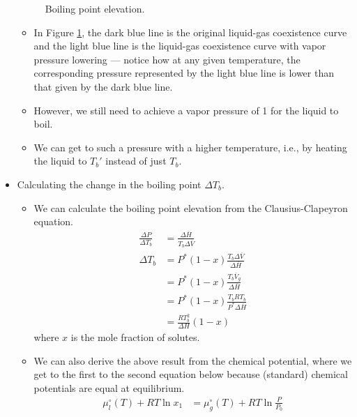 \documentclass[../notes.tex]{subfiles}
\begin{document}
\begin{itemize}
\begin{figure}[h!]
        \caption{Boiling point elevation.}
        \label{fig:BPelevate}
    \end{figure}
    \begin{itemize}
        \item In Figure \ref{fig:BPelevate}, the dark blue line is the original liquid-gas coexistence curve and the light blue line is the liquid-gas coexistence curve with vapor pressure lowering --- notice how at any given temperature, the corresponding pressure represented by the light blue line is lower than that given by the dark blue line.
        \item However, we still need to achieve a vapor pressure of \SI{1}{\atmosphere} for the liquid to boil.
        \item We can get to such a pressure with a higher temperature, i.e., by heating the liquid to $T_b'$ instead of just $T_b$.
    \end{itemize}
    \item Calculating the change in the boiling point $\Delta T_b$.
    \begin{itemize}
        \item We can calculate the boiling point elevation from the Clausius-Clapeyron equation.
        \begin{align*}
            \frac{\Delta P}{\Delta T_b} &= \frac{\Delta\overline{H}}{T_b\Delta\overline{V}}\\
            \Delta T_b &= P^*(1-x)\frac{T_b\Delta\overline{V}}{\Delta\overline{H}}\\
            &= P^*(1-x)\frac{T_b\overline{V}_g}{\Delta\overline{H}}\\
            &= P^*(1-x)\frac{T_bRT_b}{P^*\Delta\overline{H}}\\
            &= \frac{RT_b^2}{\Delta H}(1-x)
        \end{align*}
        where $x$ is the mole fraction of solutes.
        \item We can also derive the above result from the chemical potential, where we get to the first to the second equation below because (standard) chemical potentials are equal at equilibrium.
        \begin{align*}
            \mu_l^\circ(T)+RT\ln x_1 &= \mu_g^\circ(T)+RT\ln\frac{P}{P_0}\\

\end{align*}
\end{itemize}
\end{itemize}
\end{document}

